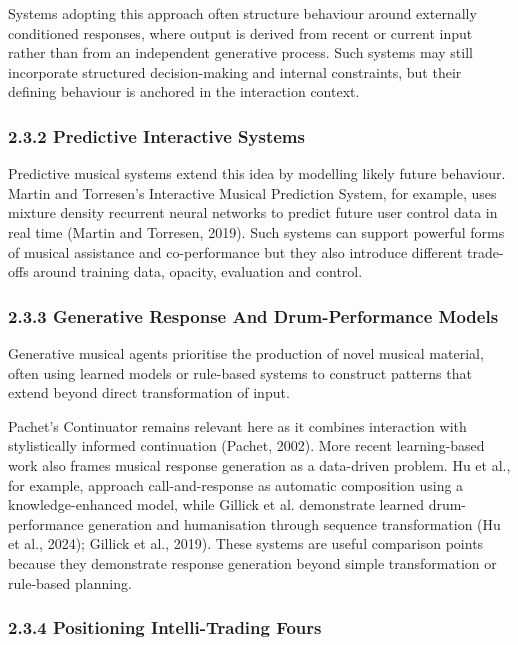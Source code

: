 Systems adopting this approach often structure behaviour around
externally conditioned responses, where output is derived from recent or
current input rather than from an independent generative process. Such
systems may still incorporate structured decision-making and internal
constraints, but their defining behaviour is anchored in the interaction
context.

\subsubsection{2.3.2 Predictive Interactive
Systems}\label{predictive-interactive-systems}

Predictive musical systems extend this idea by modelling likely future
behaviour. Martin and Torresen's Interactive Musical Prediction System,
for example, uses mixture density recurrent neural networks to predict
future user control data in real time (Martin and Torresen, 2019). Such
systems can support powerful forms of musical assistance and
co-performance but they also introduce different trade-offs around
training data, opacity, evaluation and control.

\subsubsection{2.3.3 Generative Response And Drum-Performance
Models}\label{generative-response-and-drum-performance-models}

Generative musical agents prioritise the production of novel musical
material, often using learned models or rule-based systems to construct
patterns that extend beyond direct transformation of input.

Pachet's Continuator remains relevant here as it combines interaction
with stylistically informed continuation (Pachet, 2002). More recent
learning-based work also frames musical response generation as a
data-driven problem. Hu et al., for example, approach call-and-response
as automatic composition using a knowledge-enhanced model, while Gillick
et al. demonstrate learned drum-performance generation and humanisation
through sequence transformation (Hu et al., 2024); Gillick et al.,
2019). These systems are useful comparison points because they
demonstrate response generation beyond simple transformation or
rule-based planning.

\subsubsection{2.3.4 Positioning Intelli-Trading
Fours}\label{positioning-intelli-trading-fours}

